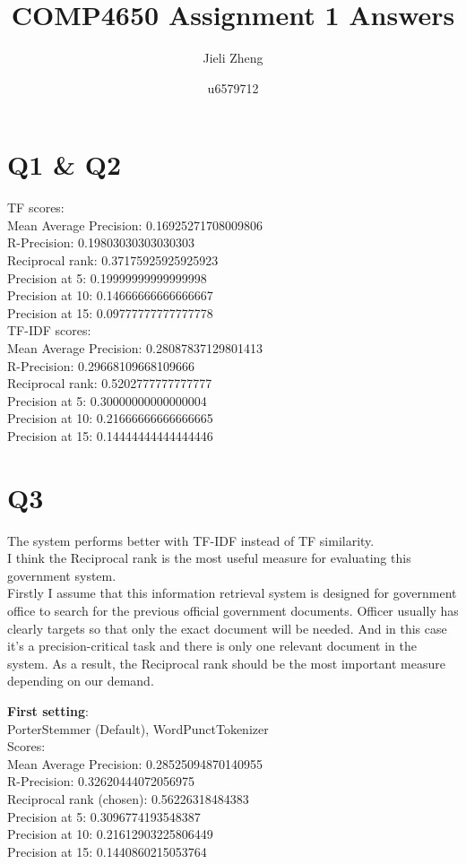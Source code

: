 \documentclass{article}
\title{COMP4650 Assignment 1 Answers}
\author{Jieli Zheng}
\date{u6579712}
\begin{document}
\maketitle

\section*{Q1 \& Q2}

TF scores:\\
Mean Average Precision: 0.16925271708009806\\
R-Precision: 0.19803030303030303\\
Reciprocal rank: 0.37175925925925923\\
Precision at 5: 0.19999999999999998\\
Precision at 10: 0.14666666666666667\\
Precision at 15: 0.09777777777777778\\

TF-IDF scores:\\
Mean Average Precision: 0.28087837129801413\\
R-Precision: 0.29668109668109666\\
Reciprocal rank: 0.5202777777777777\\
Precision at 5: 0.30000000000000004\\
Precision at 10: 0.21666666666666665\\
Precision at 15: 0.14444444444444446\\

\section*{Q3}
The system performs better with TF-IDF instead of TF similarity.\\
I think the Reciprocal rank is the most useful measure for evaluating this 
government system.\\
Firstly I assume that this information retrieval system is designed for government 
office to search for the previous official government documents. Officer usually 
has clearly targets so that only the exact document will be needed. And in this 
case it's a precision-critical task and there is only one relevant document in 
the system. As a result, the Reciprocal rank should be the most important 
measure depending on our demand.


\textbf{First setting}:\\
PorterStemmer (Default), WordPunctTokenizer\\
Scores:\\
Mean Average Precision: 0.28525094870140955\\
R-Precision: 0.32620444072056975\\
Reciprocal rank (chosen): 0.56226318484383\\
Precision at 5: 0.3096774193548387\\
Precision at 10: 0.21612903225806449\\
Precision at 15: 0.1440860215053764\\
\end{document}
